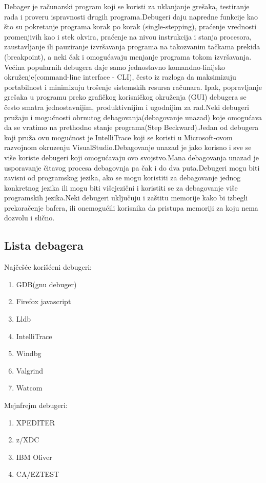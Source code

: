 \documentclass[a4paper]{article}
\begin{document}
Debager je računarski program koji se koristi za uklanjanje grešaka, testiranje rada i proveru ispravnosti drugih programa.Debugeri daju napredne funkcije kao što su pokretanje programa korak po korak (single-stepping), praćenje vrednosti promenjivih kao i stek okvira, praćenje na nivou instrukcija i stanja procesora, zaustavljanje ili pauziranje izvršavanja programa na takozvanim tačkama prekida (breakpoint), a neki čak i omogućavaju menjanje programa tokom izvršavanja.\\
\indent Većina popularnih debugera daje samo jednostavno komandno-linijsko okruženje(command-line interface - CLI), često iz razloga da maksimizuju portabilnost i minimizuju trošenje sistemskih resursa računara. Ipak, popravljanje grešaka u programu preko grafičkog korisničkog okruženja (GUI) debugera se često smatra jednostavnijim, produktivnijim i ugodnijim za rad.Neki debugeri pružaju i mogućnosti obrnutog debagovanja(debagovanje unazad) koje omogućava da se vratimo na prethodno stanje programa(Step Beckward).Jedan od debugera koji pruža ovu mogućnost je IntelliTrace koji se koristi u Microsoft-ovom razvojnom okruzenju VisualStudio.Debagovanje unazad je jako korisno i sve se više koriste debugeri koji omogućavaju ovo svojstvo.Mana debagovanja unazad je usporavanje čitavog procesa debagovnja pa čak i do dva puta.Debugeri mogu biti zavisni od programskog jezika, ako se mogu koristiti za debagovanje jednog konkretnog jezika ili mogu biti višejezični i koristiti se za debagovanje više programskih jezika.Neki debugeri uključuju i zaštitu memorije kako bi izbegli prekoračenje bafera, ili onemogućili korisnika da pristupa memoriji za koju nema dozvolu i slično.\cite{ssq_debug_def}

\subsection{Lista debagera}
\label{sec:Lista debagera}

Najčešće korišćeni debugeri\cite{ll_best_debuggers}\cite{up_best_debuggers}:
\begin{enumerate}
	\item GDB(gnu debuger)
	\item Firefox javascript 
	\item Lldb
	\item IntelliTrace
	\item Windbg
	\item Valgrind
	\item Watcom
\end{enumerate}
Mejnfrejm debugeri\cite{ll_best_debuggers}\cite{up_best_debuggers}:
\begin{enumerate}
	\item XPEDITER
	\item z/XDC
	\item IBM Oliver
	\item CA/EZTEST
\end{enumerate}
\end{document}
